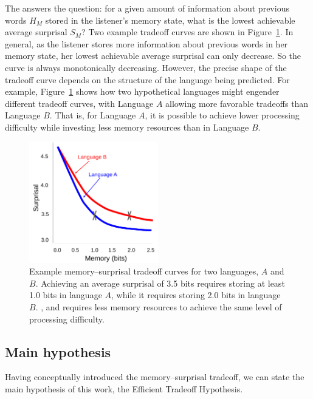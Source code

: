 The  answers the question: 
for a given amount of information about previous words $H_M$ stored in the listener's memory state, what is the lowest achievable average surprisal $S_M$? Two example tradeoff curves are shown in Figure~\ref{fig:examples}. In general, as the listener stores more information about previous words in her memory state, her lowest achievable average surprisal can only decrease. So the curve is always monotonically decreasing. However, the precise shape of the tradeoff curve depends on the structure of the language being predicted. For example, Figure~\ref{fig:examples} shows how two hypothetical languages might engender different tradeoff curves, with Language $A$ allowing more favorable tradeoffs than Language $B$. That is, for Language $A$, it is possible to achieve lower processing difficulty while investing less memory resources than in Language $B$.

\begin{figure}
\centering
\includegraphics[width=0.5\textwidth]{figures-gdrive/tradeoff-schematic.pdf}
	\caption{Example memory--surprisal tradeoff curves for two languages, $A$ and $B$. Achieving an average surprisal of 3.5 bits requires storing at least 1.0 bits in language $A$, while it requires storing 2.0 bits in language $B$. , and requires less memory resources to achieve the same level of processing difficulty.}
\label{fig:examples}
\end{figure}

\subsection{Main hypothesis}

Having conceptually introduced the memory--surprisal tradeoff, we can state the main hypothesis of this work, the Efficient Tradeoff Hypothesis.

